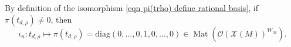 \documentclass[10pt]{article}
\newcommand{\diag}{\mathrm{diag}}
\newcommand{\pair}[2]{\left\langle #1 , #2\right\rangle}
\DeclareMathOperator{\Mat}{Mat}
\newcommand{\X}{\mathcal{X}}
\newcommand{\Oo}{\mathcal{O}}
\newcommand{\cc}{\mathbf{c}}
\newtheorem{prop}{Proposition}
\theoremstyle{definition}
\theoremstyle{remark}
\begin{document}
By definition of the isomorphism \eqref{eqn pi(trho) define rational basis}, if $\pi(t_{d,\rho})\neq 0$,
then
%
\begin{equation}
\label{eqn trho maps to monomial matrix}
\iota_u\colon t_{d,\rho}\mapsto\pi(t_{d,\rho})=\diag(0,\dots, 0,1,0,\dots, 0)\in\Mat(\Oo(\X(M))^{W_M}).
\end{equation}
%
%
\end{document}
